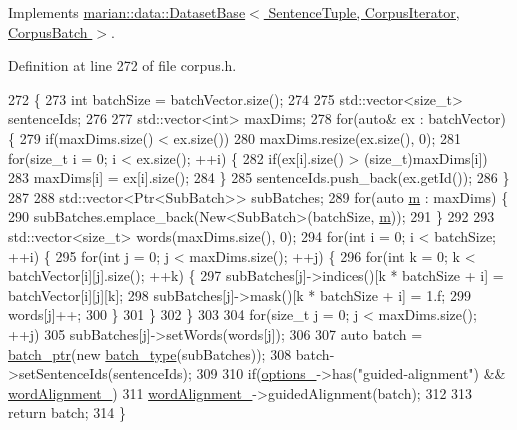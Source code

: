 Implements \hyperlink{classmarian_1_1data_1_1DatasetBase_af41218c6327ebf36ed3d8abd952fd1cd}{marian\+::data\+::\+Dataset\+Base$<$ Sentence\+Tuple, Corpus\+Iterator, Corpus\+Batch $>$}.



Definition at line 272 of file corpus.\+h.


\begin{DoxyCode}
272                                                           \{
273     \textcolor{keywordtype}{int} batchSize = batchVector.size();
274 
275     std::vector<size\_t> sentenceIds;
276 
277     std::vector<int> maxDims;
278     \textcolor{keywordflow}{for}(\textcolor{keyword}{auto}& ex : batchVector) \{
279       \textcolor{keywordflow}{if}(maxDims.size() < ex.size())
280         maxDims.resize(ex.size(), 0);
281       \textcolor{keywordflow}{for}(\textcolor{keywordtype}{size\_t} i = 0; i < ex.size(); ++i) \{
282         \textcolor{keywordflow}{if}(ex[i].size() > (size\_t)maxDims[i])
283           maxDims[i] = ex[i].size();
284       \}
285       sentenceIds.push\_back(ex.getId());
286     \}
287 
288     std::vector<Ptr<SubBatch>> subBatches;
289     \textcolor{keywordflow}{for}(\textcolor{keyword}{auto} \hyperlink{namespacefix__hard_aeddecc2eb0c9f49a568cb1bf69ac50f5}{m} : maxDims) \{
290       subBatches.emplace\_back(New<SubBatch>(batchSize, \hyperlink{namespacefix__hard_aeddecc2eb0c9f49a568cb1bf69ac50f5}{m}));
291     \}
292 
293     std::vector<size\_t> words(maxDims.size(), 0);
294     \textcolor{keywordflow}{for}(\textcolor{keywordtype}{int} i = 0; i < batchSize; ++i) \{
295       \textcolor{keywordflow}{for}(\textcolor{keywordtype}{int} j = 0; j < maxDims.size(); ++j) \{
296         \textcolor{keywordflow}{for}(\textcolor{keywordtype}{int} k = 0; k < batchVector[i][j].size(); ++k) \{
297           subBatches[j]->indices()[k * batchSize + i] = batchVector[i][j][k];
298           subBatches[j]->mask()[k * batchSize + i] = 1.f;
299           words[j]++;
300         \}
301       \}
302     \}
303 
304     \textcolor{keywordflow}{for}(\textcolor{keywordtype}{size\_t} j = 0; j < maxDims.size(); ++j)
305       subBatches[j]->setWords(words[j]);
306 
307     \textcolor{keyword}{auto} batch = \hyperlink{classmarian_1_1data_1_1DatasetBase_a4cb5e9051a072fcc61ed4638862f01f5}{batch\_ptr}(\textcolor{keyword}{new} \hyperlink{classmarian_1_1data_1_1DatasetBase_a8dd8e5fa405155eb3207e5aaa4fbdc0f}{batch\_type}(subBatches));
308     batch->setSentenceIds(sentenceIds);
309 
310     \textcolor{keywordflow}{if}(\hyperlink{classmarian_1_1data_1_1Corpus_aafc430571f253aec977c03bdc4fe0987}{options\_}->has(\textcolor{stringliteral}{"guided-alignment"}) && \hyperlink{classmarian_1_1data_1_1Corpus_ad6beb16ba8ae3d8fcd2efb1927b42016}{wordAlignment\_})
311       \hyperlink{classmarian_1_1data_1_1Corpus_ad6beb16ba8ae3d8fcd2efb1927b42016}{wordAlignment\_}->guidedAlignment(batch);
312 
313     \textcolor{keywordflow}{return} batch;
314   \}
\end{DoxyCode}


